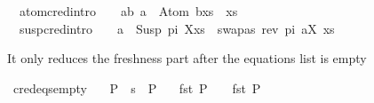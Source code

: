 \begin{isabellebody}
\ \ atom{\isacharunderscore}{\kern0pt}cred{\isacharbrackleft}{\kern0pt}intro{\isacharbang}{\kern0pt}{\isacharbrackright}{\kern0pt}{\isacharcolon}{\kern0pt}\ \ \ \ {\isachardoublequoteopen}a{\isasymnoteq}b\ {\isasymLongrightarrow}{\isacharparenleft}{\kern0pt}{\isacharbrackleft}{\kern0pt}{\isacharbrackright}{\kern0pt}{\isacharcomma}{\kern0pt}{\isacharparenleft}{\kern0pt}a\ {\isasymsharp}{\isacharquery}{\kern0pt}\ Atom\ b{\isacharparenright}{\kern0pt}{\isacharhash}{\kern0pt}xs{\isacharparenright}{\kern0pt}\ {\isasymturnstile}{\isacharbraceleft}{\kern0pt}{\isacharbraceright}{\kern0pt}{\isasymrightarrow}\ {\isacharparenleft}{\kern0pt}{\isacharbrackleft}{\kern0pt}{\isacharbrackright}{\kern0pt}{\isacharcomma}{\kern0pt}xs{\isacharparenright}{\kern0pt}{\isachardoublequoteclose}\ {\isacharbar}{\kern0pt}\isanewline
\ \ susp{\isacharunderscore}{\kern0pt}cred{\isacharbrackleft}{\kern0pt}intro{\isacharbang}{\kern0pt}{\isacharbrackright}{\kern0pt}{\isacharcolon}{\kern0pt}\ \ \ \ {\isachardoublequoteopen}{\isacharparenleft}{\kern0pt}{\isacharbrackleft}{\kern0pt}{\isacharbrackright}{\kern0pt}{\isacharcomma}{\kern0pt}{\isacharparenleft}{\kern0pt}a\ {\isasymsharp}{\isacharquery}{\kern0pt}\ Susp\ pi\ X{\isacharparenright}{\kern0pt}{\isacharhash}{\kern0pt}xs{\isacharparenright}{\kern0pt}\ {\isasymturnstile}\ {\isacharbraceleft}{\kern0pt}{\isacharparenleft}{\kern0pt}{\isacharparenleft}{\kern0pt}swapas\ {\isacharparenleft}{\kern0pt}rev\ pi{\isacharparenright}{\kern0pt}\ a{\isacharparenright}{\kern0pt}{\isacharcomma}{\kern0pt}X{\isacharparenright}{\kern0pt}{\isacharbraceright}{\kern0pt}{\isasymrightarrow}\ {\isacharparenleft}{\kern0pt}{\isacharbrackleft}{\kern0pt}{\isacharbrackright}{\kern0pt}{\isacharcomma}{\kern0pt}xs{\isacharparenright}{\kern0pt}{\isachardoublequoteclose}%
\begin{isamarkuptext}%
It only reduces the freshness part after the equations list is empty%
\end{isamarkuptext}\isamarkuptrue%
\isamarkupfalse%
\ c{\isacharunderscore}{\kern0pt}red{\isacharunderscore}{\kern0pt}eqs{\isacharunderscore}{\kern0pt}empty{\isacharcolon}{\kern0pt}\isanewline
\ \ \ {\isachardoublequoteopen}P{}\ {\isasymturnstile}\ s\ {\isasymrightarrow}\ P{}{\isachardoublequoteclose}\isanewline
\ \ \ {\isachardoublequoteopen}fst\ P{}\ {\isacharequal}{\kern0pt}\ {\isacharbrackleft}{\kern0pt}{\isacharbrackright}{\kern0pt}\ {\isasymand}\ fst\ P{}\ {\isacharequal}{\kern0pt}\ {\isacharbrackleft}{\kern0pt}{\isacharbrackright}{\kern0pt}{\isachardoublequoteclose}\isanewline

\end{isabellebody}
